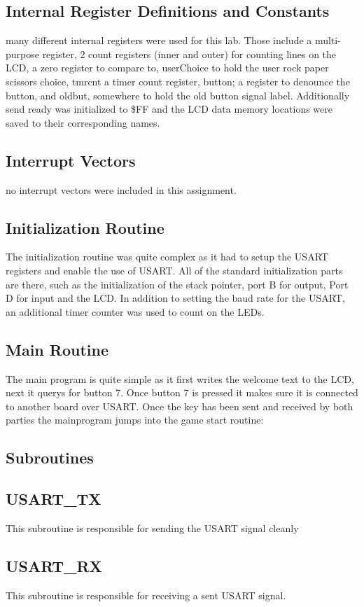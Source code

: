 \documentclass[12pt,letterpaper]{article}
\begin{document}
\subsection{Internal Register Definitions and Constants}
many different internal registers were used for this lab. Those include a multi-purpose register, 2 count registers (inner and outer) for counting lines on the LCD, a zero register to compare to, userChoice to hold the user rock paper scissors choice, tmrcnt a timer count register, button; a register to denounce the button, and oldbut, somewhere to hold the old button signal label. Additionally send ready was initialized to \$FF and the LCD data memory locations were saved to their corresponding names.

\subsection{Interrupt Vectors}
no interrupt vectors were included in this assignment. 
\subsection{Initialization Routine}
The initialization routine was quite complex as it had to setup the USART registers and enable the use of USART. All of the standard initialization parts are there, such as the initialization of the stack pointer, port B for output, Port D for input and the LCD. In addition to setting the baud rate for the USART, an additional timer counter was used to count on the LEDs.

\subsection{Main Routine}
The main program is quite simple as it first writes the welcome text to the LCD, next it querys for button 7. Once button 7 is pressed it makes sure it is connected to another board over USART. Once the key has been sent and received by both parties the mainprogram jumps into the game start routine:


\subsection{Subroutines}
	\subsection{USART\_TX}
	This subroutine is responsible for sending the USART signal cleanly
	\subsection{USART\_RX}
	This subroutine is responsible for receiving a sent USART signal.
\end{document}
